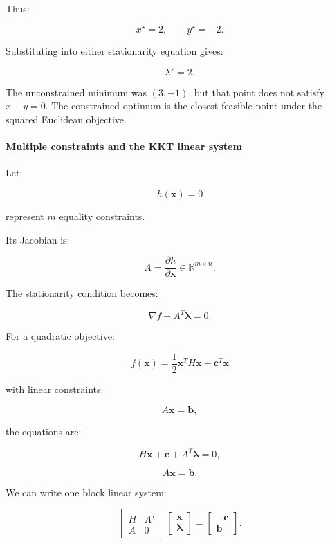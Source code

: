 Thus:

\[
\boxed{x^\star=2,\qquad y^\star=-2}.
\]

Substituting into either stationarity equation gives:

\[
\boxed{\lambda^\star=2}.
\]

The unconstrained minimum was \((3,-1)\), but that point does not satisfy \(x+y=0\). The constrained optimum is the closest feasible point under the squared Euclidean objective.

\paragraph{Multiple constraints and the KKT linear system}\label{02-foundations-ii-ch026-multiple-constraints-and-the-kkt-linear-system}

\hypertarget{02-foundations-ii-ch026-multiple-constraints-and-the-kkt-linear-system}{}

Let:

\[
h(\mathbf x)=0
\]

represent \(m\) equality constraints.

Its Jacobian is:

\[
A=\frac{\partial h}{\partial\mathbf x} \in\mathbb R^{m\times n}.
\]

The stationarity condition becomes:

\[
\nabla f+A^T\boldsymbol\lambda=0.
\]

For a quadratic objective:

\[
f(\mathbf x)=\frac12\mathbf x^TH\mathbf x+\mathbf c^T\mathbf x
\]

with linear constraints:

\[
A\mathbf x=\mathbf b,
\]

the equations are:

\[
H\mathbf x+\mathbf c+A^T\boldsymbol\lambda=0,
\]

\[
A\mathbf x=\mathbf b.
\]

We can write one block linear system:

\[
\boxed{ \begin{bmatrix} H&A^T\\ A&0 \end{bmatrix} \begin{bmatrix} \mathbf x\\ \boldsymbol\lambda \end{bmatrix} = \begin{bmatrix} -\mathbf c\\ \mathbf b \end{bmatrix} }.
\]

